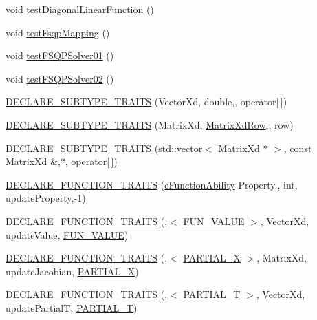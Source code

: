 \begin{DoxyCompactItemize}
void \hyperlink{namespaceocra_aca14a12e382291d2f3a2113ff1348432}{test\+Diagonal\+Linear\+Function} ()
\item 
void \hyperlink{namespaceocra_a8bf333a92a412aecd42bebe1b9befb93}{test\+Fsqp\+Mapping} ()
\item 
void \hyperlink{namespaceocra_a6841398f134f5638989988f887e7d529}{test\+F\+S\+Q\+P\+Solver01} ()
\item 
void \hyperlink{namespaceocra_a59323105067ef321d36ac86c6b4aaff8}{test\+F\+S\+Q\+P\+Solver02} ()
\item 
\hyperlink{namespaceocra_a1f55d05eac986f62fad9b7451d42159c}{D\+E\+C\+L\+A\+R\+E\+\_\+\+S\+U\+B\+T\+Y\+P\+E\+\_\+\+T\+R\+A\+I\+TS} (Vector\+Xd, double,, operator\mbox{[}$\,$\mbox{]})
\item 
\hyperlink{namespaceocra_a9122e70f2163c0c2400ac64524e21e34}{D\+E\+C\+L\+A\+R\+E\+\_\+\+S\+U\+B\+T\+Y\+P\+E\+\_\+\+T\+R\+A\+I\+TS} (Matrix\+Xd, \hyperlink{namespaceocra_a608bf0522317ed1df3bbfc6a5753bc01}{Matrix\+Xd\+Row},, row)
\item 
\hyperlink{namespaceocra_a24b7a19b32cb93b30a923419c60d442f}{D\+E\+C\+L\+A\+R\+E\+\_\+\+S\+U\+B\+T\+Y\+P\+E\+\_\+\+T\+R\+A\+I\+TS} (std\+::vector$<$ Matrix\+Xd $\ast$ $>$, const Matrix\+Xd \&,$\ast$, operator\mbox{[}$\,$\mbox{]})
\item 
\hyperlink{namespaceocra_af90b78a1c4f9c5f496838c0a2254cd6f}{D\+E\+C\+L\+A\+R\+E\+\_\+\+F\+U\+N\+C\+T\+I\+O\+N\+\_\+\+T\+R\+A\+I\+TS} (\hyperlink{namespaceocra_a40ddbec106a6034cd2047bba9945b568}{e\+Function\+Ability} Property,, int, update\+Property,-\/1)
\item 
\hyperlink{namespaceocra_a824e1cafb06db3d3a54da47469c8e234}{D\+E\+C\+L\+A\+R\+E\+\_\+\+F\+U\+N\+C\+T\+I\+O\+N\+\_\+\+T\+R\+A\+I\+TS} (,$<$ \hyperlink{namespaceocra_a40ddbec106a6034cd2047bba9945b568acfb47b20329993093d2022b017239bd8}{F\+U\+N\+\_\+\+V\+A\+L\+UE} $>$, Vector\+Xd, update\+Value, \hyperlink{namespaceocra_a40ddbec106a6034cd2047bba9945b568acfb47b20329993093d2022b017239bd8}{F\+U\+N\+\_\+\+V\+A\+L\+UE})
\item 
\hyperlink{namespaceocra_af847bdc711cc6063b38424bb15f93af1}{D\+E\+C\+L\+A\+R\+E\+\_\+\+F\+U\+N\+C\+T\+I\+O\+N\+\_\+\+T\+R\+A\+I\+TS} (,$<$ \hyperlink{namespaceocra_a40ddbec106a6034cd2047bba9945b568a59fbb6697bc43c94e6e2842d89305b9c}{P\+A\+R\+T\+I\+A\+L\+\_\+X} $>$, Matrix\+Xd, update\+Jacobian, \hyperlink{namespaceocra_a40ddbec106a6034cd2047bba9945b568a59fbb6697bc43c94e6e2842d89305b9c}{P\+A\+R\+T\+I\+A\+L\+\_\+X})
\item 
\hyperlink{namespaceocra_a941058188be37876ac5416cc29f31e8b}{D\+E\+C\+L\+A\+R\+E\+\_\+\+F\+U\+N\+C\+T\+I\+O\+N\+\_\+\+T\+R\+A\+I\+TS} (,$<$ \hyperlink{namespaceocra_a40ddbec106a6034cd2047bba9945b568aad093a42d990b60ad0e74b89ab1697b1}{P\+A\+R\+T\+I\+A\+L\+\_\+T} $>$, Vector\+Xd, update\+PartialT, \hyperlink{namespaceocra_a40ddbec106a6034cd2047bba9945b568aad093a42d990b60ad0e74b89ab1697b1}{P\+A\+R\+T\+I\+A\+L\+\_\+T})

\end{DoxyCompactItemize}
